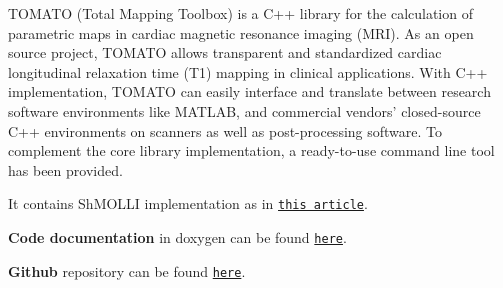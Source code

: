 T\-O\-M\-A\-T\-O (Total Mapping Toolbox) is a C++ library for the calculation of parametric maps in cardiac magnetic resonance imaging (M\-R\-I). As an open source project, T\-O\-M\-A\-T\-O allows transparent and standardized cardiac longitudinal relaxation time (T1) mapping in clinical applications. With C++ implementation, T\-O\-M\-A\-T\-O can easily interface and translate between research software environments like M\-A\-T\-L\-A\-B, and commercial vendors’ closed-\/source C++ environments on scanners as well as post-\/processing software. To complement the core library implementation, a ready-\/to-\/use command line tool has been provided.

It contains Sh\-M\-O\-L\-L\-I implementation as in \href{https://jcmr-online.biomedcentral.com/articles/10.1186/1532-429X-12-69}{\tt this article}.


\begin{DoxyItemize}
\item {\bfseries Code documentation} in doxygen can be found \href{https://mrkonrad.github.io/tomato/html/md__r_e_a_d_m_e.html}{\tt here}.
\item {\bfseries Github} repository can be found \href{https://github.com/MRKonrad/tomato}{\tt here}.
\end{DoxyItemize}

